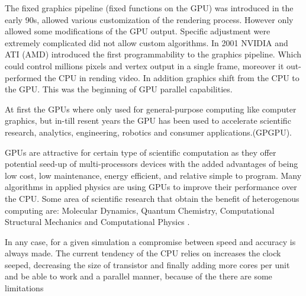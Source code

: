 The fixed graphics pipeline (fixed functions on the GPU) was introduced in the early 90s, allowed various customization of the rendering process. However only allowed some modifications of the GPU output. Specific adjustment were extremely complicated did not allow custom algorithms. In 2001 NVIDIA and ATI (AMD) introduced the first programmability to the graphics pipeline. Which could control millions pixels and vertex output in a single frame, moreover it out-performed the CPU in rending video. In addition graphics shift from the CPU to the GPU. This was the beginning of GPU parallel capabilities.

At first the GPUs where only used for general-purpose computing like computer graphics, but in-till resent years the GPU has been used to accelerate scientific research, analytics, engineering, robotics and consumer applications.(GPGPU)\cite{physicsgpu}.

GPUs are attractive for certain type of scientific computation as they offer potential seed-up of multi-processors devices with the added advantages of being low cost, low maintenance, energy efficient, and relative simple to program. Many algorithms in applied physics are using GPUs to improve their performance over the CPU. Some area of scientific research that obtain the benefit of heterogenous computing are: Molecular Dynamics, Quantum Chemistry, Computational Structural Mechanics and Computational Physics \cite{applications}.

In any case, for a given simulation a compromise between speed and accuracy is always made. The current tendency of the CPU relies on increases the clock seeped, decreasing the size of transistor and finally adding more cores per unit and be able to work and a parallel manner, because of the there are some limitations\cite{quantitative}

